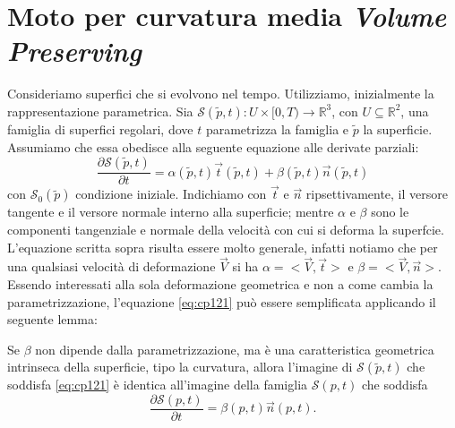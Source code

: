 \section{Moto per curvatura media \emph{Volume Preserving}}
\label{sec:cp1-sc2}
Consideriamo superfici che si evolvono nel tempo. Utilizziamo, inizialmente la rappresentazione parametrica. Sia $\mathcal{S}(\tilde{p},t):U\times[0,T)\longrightarrow\mathbb{R}^3$, con $U\subseteq\mathbb{R}^2$, una famiglia di superfici regolari, dove $t$ parametrizza la famiglia e $\tilde{p}$ la superficie. Assumiamo che essa obedisce alla seguente equazione alle derivate parziali:
\begin{equation}
  \label{eq:cp121}
  \frac{\partial\mathcal{S}(\tilde{p},t)}{\partial t} = \alpha(\tilde{p},t)\vec{t}(\tilde{p},t) + \beta(\tilde{p},t)\vec{n}(\tilde{p},t)
\end{equation}
con $\mathcal{S}_0(\tilde{p})$ condizione iniziale. Indichiamo con $\vec{t}$ e $\vec{n}$ ripsettivamente, il versore tangente e il versore normale interno alla superficie; mentre $\alpha$ e $\beta$ sono le componenti tangenziale e normale della velocità con cui si deforma la superfcie. L'equazione scritta sopra risulta essere molto generale, infatti notiamo che per una qualsiasi velocità di deformazione $\vec{V}$ si ha $\alpha=<\vec{V},\vec{t}>$ e $\beta=<\vec{V},\vec{n}>$. Essendo interessati alla sola deformazione geometrica e non a come cambia la parametrizzazione, l'equazione \eqref{eq:cp121} può essere semplificata applicando il seguente lemma:
\begin{lemma}
\label{lemm:cp-121}
Se $\beta$ non dipende dalla parametrizzazione, ma è una caratteristica geometrica intrinseca della superficie, tipo la curvatura, allora l'imagine di $\mathcal{S}(\tilde{p},t)$ che soddisfa \eqref{eq:cp121} è identica all'imagine della famiglia $\mathcal{S}(p,t)$ che soddisfa
\begin{equation}
  \label{eq:cp122}
  \frac{\partial\mathcal{S}(p,t)}{\partial t} =\beta(p,t)\vec{n}(p,t).
\end{equation}
\end{lemma}

